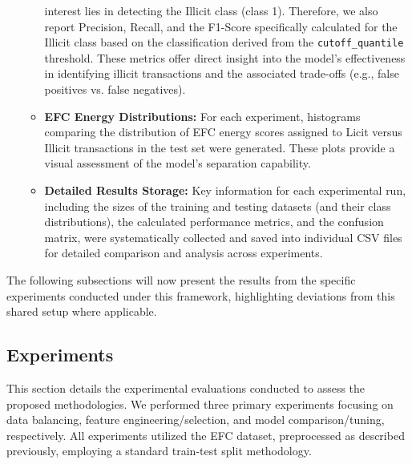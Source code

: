 \documentclass[12pt]{article}
\begin{document}
\begin{itemize}
\begin{itemize}
                interest lies in detecting the Illicit class (class 1). Therefore, we also report Precision, Recall, and
                the F1-Score specifically calculated for the Illicit class based on the classification derived from the
                \texttt{cutoff\_quantile} threshold. These metrics offer direct insight into the model's effectiveness in identifying
                illicit transactions and the associated trade-offs (e.g., false positives vs. false negatives).
              \item \textbf{EFC Energy Distributions:} For each experiment, histograms comparing the distribution of EFC
                energy scores assigned to Licit versus Illicit transactions in the test set were generated. These plots
                  provide a visual assessment of the model's separation capability.
              \item \textbf{Detailed Results Storage:} Key information for each experimental run, including the sizes of
                the training and testing datasets (and their class distributions), the calculated performance metrics,
                and the confusion matrix, were systematically collected and saved into individual CSV files for detailed
                comparison and analysis across experiments.
          \end{itemize}
\end{itemize}

The following subsections will now present the results from the specific experiments conducted under this framework, highlighting
deviations from this shared setup where applicable.

\subsection{Experiments} \label{subsec:experiments}

This section details the experimental evaluations conducted to assess the proposed methodologies. We performed three primary
experiments focusing on data balancing, feature engineering/selection, and model comparison/tuning, respectively. All
experiments utilized the EFC dataset, preprocessed as described previously, employing a standard train-test split methodology.
\end{document}
